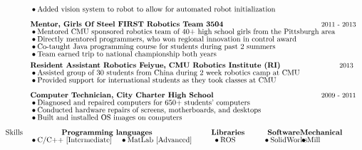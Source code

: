\documentclass[]{article}
\newcommand{\subpoint}[1]{\bullet \text{\fontsize{10pt}{12pt}\selectfont #1}}
\newcommand{\Date}[1]{ \text{\fontsize{9pt}{12pt}\selectfont #1}}
\begin{document}
\begin{align*}
& && \subpoint{ Added vision system to robot to allow for automated robot initialization }\\[.5em]
%
& && \textbf{Mentor, Girls Of Steel FIRST Robotics Team 3504} && 
\hspace{-1.0cm} \Date{2011 - 2013}\\[-.5em]
%
& && \subpoint{ Mentored CMU sponsored robotics team of 40+ high school girls from the Pittsburgh area}\\[-.5em]
& && \subpoint{ Directly mentored programmers, who won regional innovation in control  award}\\[-.5em]
& && \subpoint{ Co-taught Java programming course for students during past 2 summers}\\[-.5em]
& && \subpoint{ Team earned trip to national  championship both years} \\
%
& && \textbf{Resident Assistant Robotics Feiyue, CMU Robotics Institute (RI) }&&
 \hspace{-.15cm} \Date{ 2013}\\[-.5em]
& && \subpoint{Assisted group of 30 students from China during 2 week robotics camp at CMU}\\[-.5em]
& && \subpoint{Provided support for international students as they took classes at CMU}\\[.5em]
%
%
& && \textbf{Computer Technician, City Charter High School} && 
\hspace{-1.0cm} \Date{2009 - 2011}\\[-.5em]
& && \subpoint{Diagnosed and repaired computers for 650+ students' computers}\\[-.5em]
& && \subpoint{Conducted hardware repairs of screens, motherboards, and desktops}\\[-.5em]
& && \subpoint{Built and installed OS images on computers}\\[.5em]
%
%
%
&\text{Skills} && \textbf{ \hspace{1.2cm} Programming languages \hspace{2.5cm} Libraries \hspace{.8cm} Software} && \hspace{-2.0 cm}\textbf{Mechanical} \\[-.5em]
& && \subpoint{C/C++ [Intermediate]} \hspace{.4cm} \subpoint{MatLab [Advanced]} \hspace{1cm} \subpoint{ROS} \hspace{1.3cm} \subpoint{SolidWorks} && \hspace{-2.0 cm} \subpoint{Mill}\\[-.5em]

\end{align*}
\end{document}
